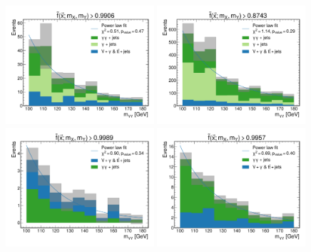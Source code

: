 \begin{figure}
    \centering
    \includegraphics[width=0.49\textwidth]{Figures/Dihiggs/categorisation/mgg_sculpting/graviton/all_bkg/intermediate_transformed_score_GluGluToBulkGravitonToHHTo2G2Tau_M-550_frac_uncert_0.1.pdf}
    \includegraphics[width=0.49\textwidth]{Figures/Dihiggs/categorisation/mgg_sculpting/graviton/all_bkg/intermediate_transformed_score_GluGluToBulkGravitonToHHTo2G2Tau_M-550_frac_uncert_0.05.pdf}
    \includegraphics[width=0.49\textwidth]{Figures/Dihiggs/categorisation/mgg_sculpting/graviton/exclude_gjet/intermediate_transformed_score_GluGluToBulkGravitonToHHTo2G2Tau_M-550_frac_uncert_0.1.pdf}
    \includegraphics[width=0.49\textwidth]{Figures/Dihiggs/categorisation/mgg_sculpting/graviton/exclude_gjet/intermediate_transformed_score_GluGluToBulkGravitonToHHTo2G2Tau_M-550_frac_uncert_0.05.pdf}

\end{figure}
